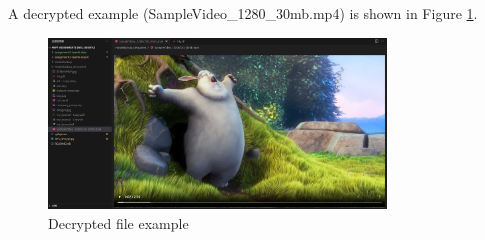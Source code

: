 \documentclass[11pt]{article}
\begin{document}
A decrypted example (SampleVideo\_1280\_30mb.mp4) is shown in
Figure \ref{fig:decrypted_exapmle}.
\begin{figure}[htbp]
    \centering
    \includegraphics[width=0.8\textwidth]{img/decrypted_exapmle.png}
    \caption{Decrypted file example}
    \label{fig:decrypted_exapmle}
\end{figure}
\end{document}
